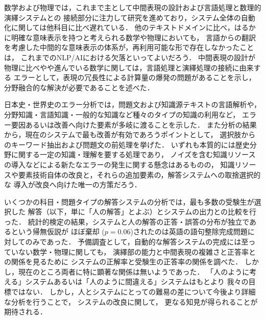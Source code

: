 \documentclass[japanese]{jnlp_1.4b}
\begin{document}
数学および物理では，これまで主として中間表現の設計および言語処理と数理的演繹システムとの
接続部分に注力して研究を進めており，システム全体の自動化に関しては他科目に比べ遅れている．
他のテキストドメインに比べ，はるかに明確な意味表示を持つと考えられる数学や物理においても，
言語からの翻訳を考慮した中間的な意味表示の体系が，再利用可能な形で存在しなかったことは，
これまでのNLP/AIにおける欠落といってよいだろう．
中間表現の設計が物理に比べやや進んでいる数学に関しては，言語処理と演繹処理の接続に由来する
エラーとして，表現の冗長性による計算量の爆発の問題があることを示し，
分野融合的な解決が必要であることを述べた．

日本史・世界史のエラー分析では，問題文および知識源テキストの言語解析や，
分野知識・言語知識・一般的な知識など種々のタイプの知識の利用など，
エラー要因あるいは改善へ向けた要素が多岐に渡ることを示した．
また分析の結果から，現在のシステムで最も改善が有効であろうポイントとして，
選択肢からのキーワード抽出および問題文の前処理を挙げた．
いずれも本質的には歴史分野に関する一定の知識・理解を要する処理であり，
ノイズを含む知識リソースの導入などによる新たなエラーの発生に関する懸念はあるものの，
知識リソースや要素技術自体の改良と，それらの追加要素の，解答システムへの取捨選択的な
導入が改良へ向けた唯一の方策だろう．


いくつかの科目・問題タイプの解答システムの分析では，最も多数の受験生が選択した
解答（以下，単に「人の解答」とよぶ）とシステムの出力との比較を行った．
統計的検定の結果，システムと人の解答の正答・誤答の分布が独立であるという帰無仮説が
ほぼ棄却 ($p=0.06$)されたのは英語の語句整除完成問題に対してのみであった．
予備調査として，自動的な解答システムの完成には至っていない数学・物理に関しても，
演繹部の能力と中間表現の複雑さと正答率との関係を見るために
システムの正解率と受験生の正答率の関係を調べた．
しかし，現在のところ両者に特に顕著な関係は無いようであった．
「人のように考える」システムあるいは「人のように間違える」システムはもとより
我々の目標ではない．
しかし，人とシステムにとっての難易の差について今後より詳細な分析を行うことで，
システムの改良に関して，
更なる知見が得られることが期待される．
\end{document}
